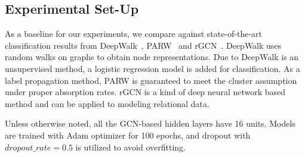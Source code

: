 \subsection{Experimental Set-Up}
As a baseline for our experiments, we compare against state-of-the-art classification results from DeepWalk~\cite{perozzi2014deepwalk}, PARW~\cite{wu2012learning} and rGCN~\cite{schlichtkrull2018modeling}. DeepWalk uses random walks on graphs to obtain node representations. Due to DeepWalk is an unsupervised method, a logistic regression model is added for classification. As a label propagation method, PARW is guaranteed to meet the cluster assumption under proper absorption rates. rGCN is a kind of deep neural network based method and can be applied to modeling relational data. 

Unless otherwise noted, all the GCN-based hidden layers have 16 units. Models are trained with Adam optimizer for 100 epochs, and dropout with $dropout\_rate=0.5$ is utilized to avoid overfitting.

